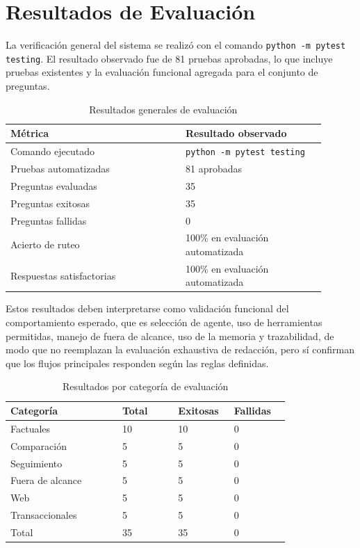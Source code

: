 \documentclass[conference]{IEEEtran}
\begin{document}
\section{Resultados de Evaluación}

La verificación general del sistema se realizó con el comando \texttt{python -m pytest testing}. El resultado observado fue de 81 pruebas aprobadas, lo que incluye pruebas existentes y la evaluación funcional agregada para el conjunto de preguntas.

\begin{table}[!t]
\caption{Resultados generales de evaluación}
\label{tab:evaluacion-resultados}
\centering
\begin{tabular}{p{0.50\linewidth} p{0.40\linewidth}}
\hline
\textbf{Métrica} & \textbf{Resultado observado} \\
\hline
Comando ejecutado & \texttt{python -m pytest testing} \\
Pruebas automatizadas & 81 aprobadas \\
Preguntas evaluadas & 35 \\
Preguntas exitosas & 35 \\
Preguntas fallidas & 0 \\
Acierto de ruteo & 100\% en evaluación automatizada \\
Respuestas satisfactorias & 100\% en evaluación automatizada \\
\hline
\end{tabular}
\end{table}

Estos resultados deben interpretarse como validación funcional del comportamiento esperado, que es selección de agente, uso de herramientas permitidas, manejo de fuera de alcance, uso de la memoria y trazabilidad, de modo que no reemplazan la evaluación exhaustiva de redacción, pero sí confirman que los flujos principales responden según las reglas definidas.


\begin{table}[!t]
\caption{Resultados por categoría de evaluación}
\label{tab:evaluacion-categorias}
\centering
\begin{tabular}{p{0.36\linewidth} p{0.18\linewidth} p{0.18\linewidth} p{0.18\linewidth}}
\hline
\textbf{Categoría} & \textbf{Total} & \textbf{Exitosas} & \textbf{Fallidas} \\
\hline
Factuales & 10 & 10 & 0 \\
Comparación & 5 & 5 & 0 \\
Seguimiento & 5 & 5 & 0 \\
Fuera de alcance & 5 & 5 & 0 \\
Web & 5 & 5 & 0 \\
Transaccionales & 5 & 5 & 0 \\
\hline
Total & 35 & 35 & 0 \\
\hline
\end{tabular}
\end{table}
\end{document}
